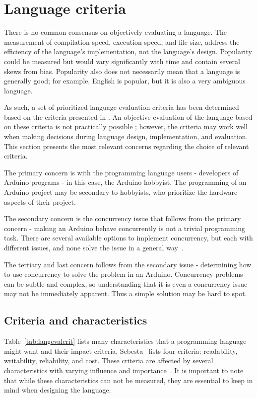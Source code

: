 \section{Language criteria}\label{sec:languageeval}
There is no common consensus on objectively evaluating a language. The measurement of compilation speed, execution speed, and file size, address the efficiency of the language's implementation, not the language's design. Popularity could be measured but would vary significantly with time and contain several skews from bias. Popularity also does not necessarily mean that a language is generally good; for example, English is popular, but it is also a very ambiguous language.

As such, a set of prioritized language evaluation criteria has been determined based on the criteria presented in \cite{Sebesta2016}. An objective evaluation of the language based on these criteria is not practically possible \cite{Sebesta2016}; however, the criteria may work well when making decisions during language design, implementation, and evaluation. This section presents the most relevant concerns regarding the choice of relevant criteria.

The primary concern is with the programming language users - developers of Arduino programs - in this case, the Arduino hobbyist. The programming of an Arduino project may be secondary to hobbyists, who prioritize the hardware aspects of their project.

The secondary concern is the concurrency issue that follows from the primary concern - making an Arduino behave concurrently is not a trivial programming task. There are several available options to implement concurrency, but each with different issues, and none solve the issue in a general way~\cite{Restucia2022}.

The tertiary and last concern follows from the secondary issue - determining how to use concurrency to solve the problem in an Arduino. Concurrency problems can be subtle and complex, so understanding that it is even a  concurrency issue may not be immediately apparent. Thus a simple solution may be hard to spot.


\subsection{Criteria and characteristics}\label{subsec:priorityofcriteria}
Table~\ref{tab:langevalcrit} lists many characteristics that a programming language might want and their impact criteria. Sebesta~\cite{Sebesta2016} lists four criteria: readability, writability, reliability, and cost. These criteria are affected by several characteristics with varying influence and importance~\cite{Sebesta2016}. It is important to note that while these characteristics can not be measured, they are essential to keep in mind when designing the language.


